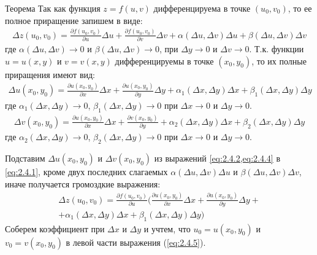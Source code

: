 \begin{tbox*}{Теорема}
	Так как функция $z = f(u, v)$ дифференцируема в точке $(u_0, v_0)$, то ее полное приращение запишем в виде:
	\begin{align} \label{eq:2.4.2}
		\Delta z (u_0, v_0) = \frac{\partial f(u_0, v_0)}{\partial u} \Delta u + \frac{\partial f(u_0, v_0)}{\partial v} \Delta v + \alpha(\Delta u, \Delta v) \Delta u + \beta (\Delta u, \Delta v) \Delta v
	\end{align}
	где $\alpha(\Delta u, \Delta v) \to 0$ и $\beta(\Delta u, \Delta v) \to 0$, при $\Delta y \to 0$ и $\Delta v \to 0$. Т.к. функции $u = u(x,y)$ и $v = v(x,y)$ дифференцируемы в точке $(x_0, y_0)$, то их полные приращения имеют вид:
	\begin{align} \label{eq:2.4.3}
		\Delta u(x_0, y_0) = \frac{\partial u(x_0, y_0)}{\partial x} \Delta x + \frac{\partial u(x_0, y_0)}{\partial y} \Delta y + \alpha_1(\Delta x, \Delta y) \Delta x + \beta_1 (\Delta x, \Delta y) \Delta y
	\end{align}
	где $\alpha_1(\Delta x, \Delta y) \to 0$, $\beta_1(\Delta x, \Delta y) \to 0$ при $\Delta x \to 0$ и $\Delta y \to 0$.
	\begin{align} \label{eq:2.4.4}
		\Delta v(x_0, y_0) = \frac{\partial u(x_0, y_0)}{\partial x} \Delta x + \frac{\partial v(x_0, y_0)}{\partial y} + \alpha_2(\Delta x, \Delta y) \Delta x + \beta_2(\Delta x, \Delta y) \Delta y
	\end{align}
	где $\alpha_2(\Delta x, \Delta y) \to 0$, $\beta_2 (\Delta x, \Delta y) \to 0$ при $\Delta x \to 0$ и $\Delta y \to 0$.

	Подставим $\Delta u(x_0, y_0)$ и $\Delta v(x_0, y_0)$ из выражений \cref{eq:2.4.2,eq:2.4.4} в \cref{eq:2.4.1}, кроме двух последних слагаемых $\alpha(\Delta u, \Delta v) \Delta u$ и $\beta(\Delta u, \Delta v) \Delta v$, иначе получается громоздкие выражения:
	\begin{multline} \label{eq:2.4.5}
		\Delta z(u_0, v_0) = \frac{\partial f(u_0, v_0)}{\partial u} \bigg(\frac{\partial u(x_0, y_0)}{\partial x} \Delta x + \frac{\partial u(x_0, y_0)}{\partial y} \Delta y + \\ + \alpha_1 (\Delta x, \Delta y) \Delta x + \beta_1(\Delta x, \Delta y) \Delta y\bigg)
	\end{multline}
	Соберем коэффициент при $\Delta x$ и $\Delta y$ и учтем, что $u_0 = u(x_0, y_0)$ и $v_0 = v(x_0, y_0)$ в левой части выражения (\ref{eq:2.4.5}).
\end{tbox*}

